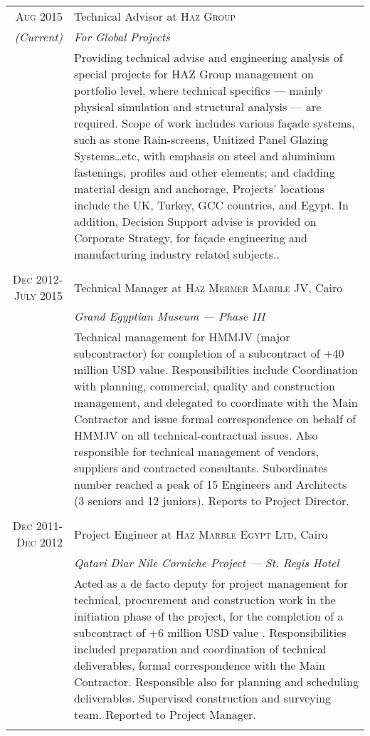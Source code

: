 \documentclass[a4paper,11pt]{article} %
\begin{document}
\begin{tabular}{r|p{11cm}}

\textsc{Aug 2015} &Technical Advisor at \textsc{Haz Group}\\
\emph{(Current)} & \emph{For Global Projects} \\
& \footnotesize{Providing technical advise and engineering analysis of special projects for HAZ Group management on portfolio level, where technical specifics --- mainly physical simulation and structural analysis --- are required. Scope of work includes various fa\c{c}ade systems, such as stone Rain-screens, Unitized Panel Glazing Systems\ldots etc, with emphasis on steel and aluminium fastenings, profiles and other elements; and cladding material design and anchorage, Projects' locations include the UK, Turkey, GCC countries, and Egypt. In addition, Decision Support advise is provided on Corporate Strategy, for fa\c{c}ade engineering and manufacturing industry related subjects..}\\
\multicolumn{2}{c}{} \\



\textsc{Dec 2012-July 2015} & Technical Manager at \textsc{Haz Mermer Marble JV}, Cairo\\
& \emph{Grand Egyptian Museum --- Phase III}\\ 
& \footnotesize{Technical management for HMMJV (major subcontractor) for completion of a subcontract of +40 million USD value. Responsibilities include Coordination with planning, commercial, quality and construction management, and delegated to coordinate with the Main Contractor and issue formal correspondence on behalf of HMMJV on all technical-contractual issues. Also responsible for technical management of vendors, suppliers and contracted consultants. Subordinates number reached a peak of 15 Engineers and Architects (3 seniors and 12 juniors). Reports to Project Director.}\\
\multicolumn{2}{c}{} \\


\textsc{Dec 2011-Dec 2012} & Project Engineer at \textsc{Haz Marble Egypt Ltd}, Cairo \\
& \emph{Qatari Diar Nile Corniche Project --- St. Regis Hotel} \\
& \footnotesize{Acted as a de facto deputy for project management for technical, procurement and construction work in the initiation phase of the project, for the completion of a subcontract of +6 million USD value . Responsibilities included preparation and coordination of technical deliverables, formal correspondence with the Main Contractor. Responsible also for planning and scheduling deliverables. Supervised construction and surveying team. Reported to Project Manager.}\\
\multicolumn{2}{c}{} \\


\end{tabular}
\end{document}

